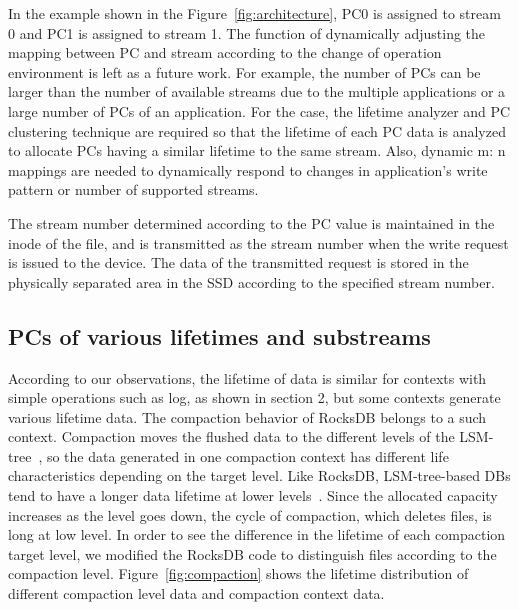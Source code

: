 In the example shown in the Figure~\ref{fig:architecture}, PC0 is assigned 
to stream 0 and PC1 is assigned to stream 1.
The function of dynamically adjusting the mapping between PC and stream 
according to the change of operation environment is left as a future work.
For example, the number of PCs can be larger than the number of available streams
due to the multiple applications or a large number of PCs of an application.
For the case, the lifetime analyzer and PC clustering technique are required so that 
the lifetime of each PC data is analyzed to allocate PCs having a similar lifetime to the same stream.
Also, dynamic m: n mappings are needed to dynamically respond to changes in 
application's write pattern or number of supported streams.

The stream number determined according to the PC value is maintained in the inode of the file, 
and is transmitted as the stream number when the write request is issued to the device. 
The data of the transmitted request is stored in the physically separated area 
in the SSD according to the specified stream number.


\subsection{PCs of various lifetimes and substreams}
According to our observations, the lifetime of data is similar 
for contexts with simple operations such as log, as shown in section 2, 
but some contexts generate various lifetime data.
The compaction behavior of RocksDB belongs to a such context.
Compaction moves the flushed data to the different levels
of the LSM-tree~\cite{RocksDB}, 
so the data generated in one compaction context has 
different life characteristics depending on the target level.
Like RocksDB, LSM-tree-based DBs tend to have a longer 
data lifetime at lower levels~\cite{Level}.
Since the allocated capacity increases as the level goes down, 
the cycle of compaction, which deletes files, is long at low level.
In order to see the difference in the lifetime of each compaction target level,
we modified the RocksDB code to distinguish files according to the compaction level.
Figure~\ref{fig:compaction} shows the lifetime distribution of 
different compaction level data and compaction context data.

